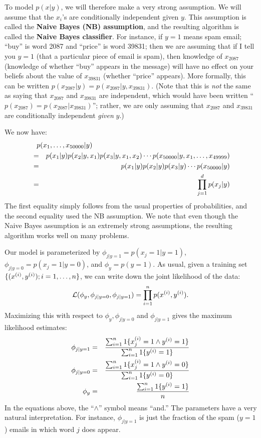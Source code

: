 \documentclass{article}
\begin{document}
To model $p(x|y)$, we will therefore make a very strong assumption.  We will
assume that the $x_i$'s are conditionally independent given $y$.
This assumption is called the {\bf Naive Bayes (NB) assumption}, and the
resulting algorithm is called the {\bf Naive Bayes classifier}.
For instance, if $y=1$ means spam email; ``buy'' is word 2087 and ``price'' is word 39831;
then we are assuming that if I tell you $y=1$ (that a particular piece of email is spam), then
knowledge of $x_{2087}$ (knowledge of whether ``buy'' appears in the message) will have
no effect on your beliefs about the value of $x_{39831}$ (whether ``price'' appears).
More formally, this can be written $p(x_{2087}|y) = p(x_{2087}|y, x_{39831})$.
(Note that this is \emph{not} the same as saying that $x_{2087}$ and $x_{39831}$
are independent, which would have been written  ``$p(x_{2087}) = p(x_{2087}| x_{39831})$''; rather,
we are only assuming that $x_{2087}$ and $x_{39831}$ are conditionally independent \emph{given} $y$.)

We now have:
\begin{eqnarray*}
p(x_1,\ldots,x_{50000}|y) \hbox to -1.2in{}&&\\
&=& p(x_1|y) p(x_2|y, x_1) p(x_3|y, x_1, x_2) \cdots p(x_{50000}|y, x_1,\ldots, x_{49999}) \\
&=&p(x_1|y) p(x_2|y) p(x_3|y) \cdots p(x_{50000}|y) \\
&=& \prod_{j=1}^\di p(x_j|y)
\end{eqnarray*}
The first equality simply follows from the usual properties of probabilities,
and the second equality used the NB assumption.
We note that even though the Naive Bayes assumption is an extremely strong
assumptions, the resulting algorithm works well on many problems.

Our model is parameterized by $\phi_{j|y=1} = p(x_j=1 | y=1)$,
$\phi_{j|y=0} = p(x_j=1 | y=0)$,
and $\phi_y = p(y=1)$.  As usual, given a training set $\{(\xsi, \ysi); i=1,\ldots,\nexp\}$, we
can write down the joint likelihood of the data:
\[
\calL(\phi_y, \phi_{j|y=0}, \phi_{j|y=1}) = \prod_{i=1}^\nexp p(\xsi, \ysi).
\]
Maximizing this with respect to $\phi_y, \phi_{j|y=0}$ and $\phi_{j|y=1}$ gives
the maximum likelihood estimates:
\begin{eqnarray*}
\phi_{j|y=1} &=& \frac{\sum_{i=1}^\nexp 1\{x^{(i)}_j =1 \wedge \ysi=1\}}{\sum_{i=1}^\nexp 1\{\ysi=1\}} \\
\phi_{j|y=0} &=& \frac{\sum_{i=1}^\nexp 1\{x^{(i)}_j =1 \wedge \ysi=0\}}{\sum_{i=1}^\nexp 1\{\ysi=0\}} \\
\phi_y &=& \frac{\sum_{i=1}^\nexp 1\{\ysi = 1\}}{\nexp}
\end{eqnarray*}
In the equations above, the ``$\wedge$'' symbol means ``and.''  The parameters have
a very natural interpretation.  For instance, $\phi_{j|y=1}$ is just the fraction of
the spam ($y=1$) emails in which word $j$ does appear.
\end{document}
